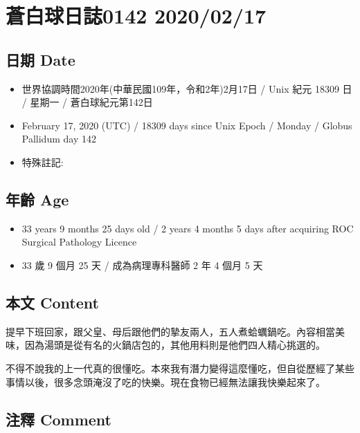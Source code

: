 \documentclass[
]{article}
\providecommand{\tightlist}{%
  \setlength{\itemsep}{0pt}\setlength{\parskip}{0pt}}
\begin{document}
\hypertarget{ux84bcux767dux7403ux65e5ux8a8c0142-20200217}{%
\section{蒼白球日誌0142
2020/02/17}\label{ux84bcux767dux7403ux65e5ux8a8c0142-20200217}}

\hypertarget{ux65e5ux671f-date-16}{%
\subsection{日期 Date}\label{ux65e5ux671f-date-16}}

\begin{itemize}
\tightlist
\item
  世界協調時間2020年(中華民國109年，令和2年)2月17日 / Unix 紀元 18309 日
  / 星期一 / 蒼白球紀元第142日
\item
  February 17, 2020 (UTC) / 18309 days since Unix Epoch / Monday /
  Globus Pallidum day 142
\item
  特殊註記:
\end{itemize}

\hypertarget{ux5e74ux9f61-age-16}{%
\subsection{年齡 Age}\label{ux5e74ux9f61-age-16}}

\begin{itemize}
\tightlist
\item
  33 years 9 months 25 days old / 2 years 4 months 5 days after
  acquiring ROC Surgical Pathology Licence
\item
  33 歲 9 個月 25 天 / 成為病理專科醫師 2 年 4 個月 5 天
\end{itemize}

\hypertarget{ux672cux6587-content-16}{%
\subsection{本文 Content}\label{ux672cux6587-content-16}}

提早下班回家，跟父皇、母后跟他們的摯友兩人，五人煮蛤蠣鍋吃。內容相當美味，因為湯頭是從有名的火鍋店包的，其他用料則是他們四人精心挑選的。

不得不說我的上一代真的很懂吃。本來我有潛力變得這麼懂吃，但自從歷經了某些事情以後，很多念頭淹沒了吃的快樂。現在食物已經無法讓我快樂起來了。

\hypertarget{ux6ce8ux91cb-comment-16}{%
\subsection{注釋 Comment}\label{ux6ce8ux91cb-comment-16}}
\end{document}
